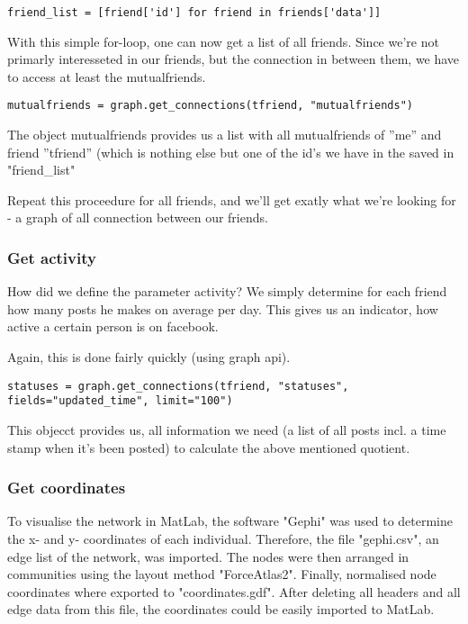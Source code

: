 \begin{lstlisting}
friend_list = [friend['id'] for friend in friends['data']]
\end{lstlisting}

With this simple for-loop, one can now get a list of all friends. Since we're not primarly interesseted in our friends, but the connection in between them, we have to access at least the mutualfriends. 

\begin{lstlisting}
mutualfriends = graph.get_connections(tfriend, "mutualfriends")
\end{lstlisting}

The object mutualfriends provides us a list with all mutualfriends of ''me'' and friend ''tfriend'' (which is nothing else but one of the id's we have in the saved in "friend\_list"

Repeat this proceedure for all friends, and we'll get exatly what we're looking for - a graph of all connection between our friends.

\subsubsection{Get activity}

How did we define the parameter activity? We simply determine for each friend how many posts he makes on average per day. This gives us an indicator, how active a certain person is on facebook. 

Again, this is done fairly quickly (using graph api).

\begin{lstlisting}
statuses = graph.get_connections(tfriend, "statuses", fields="updated_time", limit="100")
\end{lstlisting}

This objecct provides us, all information we need (a list of all posts incl. a time stamp when it's been posted) to calculate the above mentioned quotient.

\subsubsection{Get coordinates}
To visualise the network in MatLab, the software "Gephi" was used to determine the x- and y- coordinates of each individual. Therefore, the file "gephi.csv", an edge list of the network, was imported. The nodes were then arranged in communities using the layout method "ForceAtlas2". Finally, normalised node coordinates where exported to "coordinates.gdf". After deleting all headers and all edge data from this file, the coordinates could be easily imported to MatLab.

